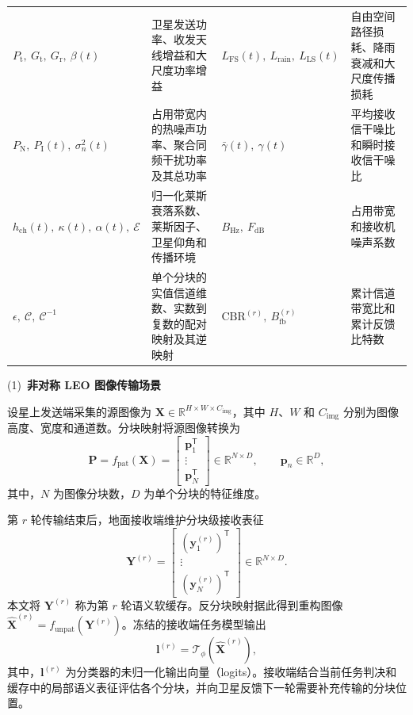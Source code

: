 \begin{longtable}[c]{@{}p{}p{}p{}p{}@{}}
  $P_{\mathrm t},\ G_{\mathrm t},\ G_{\mathrm r},\ \beta(t)$ & 卫星发送功率、收发天线增益和大尺度功率增益 & $L_{\mathrm{FS}}(t),\ L_{\mathrm{rain}},\ L_{\mathrm{LS}}(t)$ & 自由空间路径损耗、降雨衰减和大尺度传播损耗 \\
  $P_{\mathrm N},\ P_{\mathrm I}(t),\ \sigma_n^2(t)$ & 占用带宽内的热噪声功率、聚合同频干扰功率及其总功率 & $\bar\gamma(t),\ \gamma(t)$ & 平均接收信干噪比和瞬时接收信干噪比 \\
  $h_{\mathrm{ch}}(t),\ \kappa(t),\ \alpha(t),\ \mathcal E$ & 归一化莱斯衰落系数、莱斯因子、卫星仰角和传播环境 & $B_{\mathrm{Hz}},\ F_{\mathrm{dB}}$ & 占用带宽和接收机噪声系数 \\
  $\epsilon,\ \mathcal C,\ \mathcal C^{-1}$ & 单个分块的实值信道维数、实数到复数的配对映射及其逆映射 & $\mathrm{CBR}^{(r)},\ B_{\mathrm{fb}}^{(r)}$ & 累计信道带宽比和累计反馈比特数 \\
\end{longtable}

\noindent(1)~\textbf{非对称 LEO 图像传输场景}

设星上发送端采集的源图像为 $\mathbf X\in\mathbb R^{H\times W\times C_{\mathrm{img}}}$，其中 $H$、$W$ 和 $C_{\mathrm{img}}$ 分别为图像高度、宽度和通道数。分块映射将源图像转换为
\begin{equation}\label{eq:ch6_patch}
\mathbf P=f_{\mathrm{pat}}(\mathbf X)
=\begin{bmatrix}
\mathbf p_1^{\mathsf T}\\[-1pt]
\vdots\\[-1pt]
\mathbf p_N^{\mathsf T}
\end{bmatrix}
\in\mathbb R^{N\times D},\qquad \mathbf p_n\in\mathbb R^{D},
\end{equation}
其中，$N$ 为图像分块数，$D$ 为单个分块的特征维度。

第 $r$ 轮传输结束后，地面接收端维护分块级接收表征
\begin{equation}\label{eq:ch6_state}
\mathbf Y^{(r)}
=\begin{bmatrix}
(\mathbf y_1^{(r)})^{\mathsf T}\\[-1pt]
\vdots\\[-1pt]
(\mathbf y_N^{(r)})^{\mathsf T}
\end{bmatrix}
\in\mathbb R^{N\times D}.
\end{equation}
本文将 $\mathbf Y^{(r)}$ 称为第 $r$ 轮语义软缓存。反分块映射据此得到重构图像 $\hat{\mathbf X}^{(r)}=f_{\mathrm{unpat}}(\mathbf Y^{(r)})$。冻结的接收端任务模型输出
\begin{equation}\label{eq:ch6_logits}
\mathbf l^{(r)}=\mathcal T_\phi\!\left(\hat{\mathbf X}^{(r)}\right),
\end{equation}
其中，$\mathbf l^{(r)}$ 为分类器的未归一化输出向量（logits）。接收端结合当前任务判决和缓存中的局部语义表征评估各个分块，并向卫星反馈下一轮需要补充传输的分块位置。

